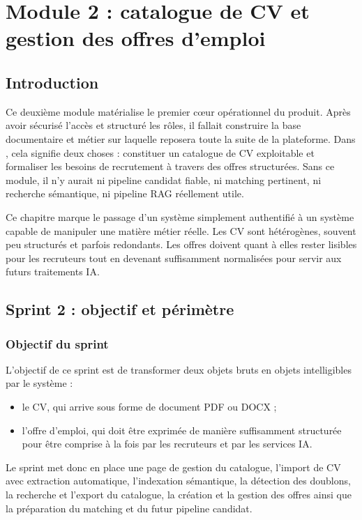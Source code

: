 \chapter{Module 2 : catalogue de CV et gestion des offres d'emploi}

\section*{Introduction}
Ce deuxième module matérialise le premier c\oe{}ur opérationnel du produit. Après avoir sécurisé l'accès et structuré les rôles, il fallait construire la base documentaire et métier sur laquelle reposera toute la suite de la plateforme. Dans \projectname{}, cela signifie deux choses : constituer un catalogue de CV exploitable et formaliser les besoins de recrutement à travers des offres structurées. Sans ce module, il n'y aurait ni pipeline candidat fiable, ni matching pertinent, ni recherche sémantique, ni pipeline RAG réellement utile.

Ce chapitre marque le passage d'un système simplement authentifié à un système capable de manipuler une matière métier réelle. Les CV sont hétérogènes, souvent peu structurés et parfois redondants. Les offres doivent quant à elles rester lisibles pour les recruteurs tout en devenant suffisamment normalisées pour servir aux futurs traitements IA.

\section{Sprint 2 : objectif et périmètre}

\subsection{Objectif du sprint}
L'objectif de ce sprint est de transformer deux objets bruts en objets intelligibles par le système :
\begin{itemize}
  \item le CV, qui arrive sous forme de document PDF ou DOCX ;
  \item l'offre d'emploi, qui doit être exprimée de manière suffisamment structurée pour être comprise à la fois par les recruteurs et par les services IA.
\end{itemize}

Le sprint met donc en place une page de gestion du catalogue, l'import de CV avec extraction automatique, l'indexation sémantique, la détection des doublons, la recherche et l'export du catalogue, la création et la gestion des offres ainsi que la préparation du matching et du futur pipeline candidat.

